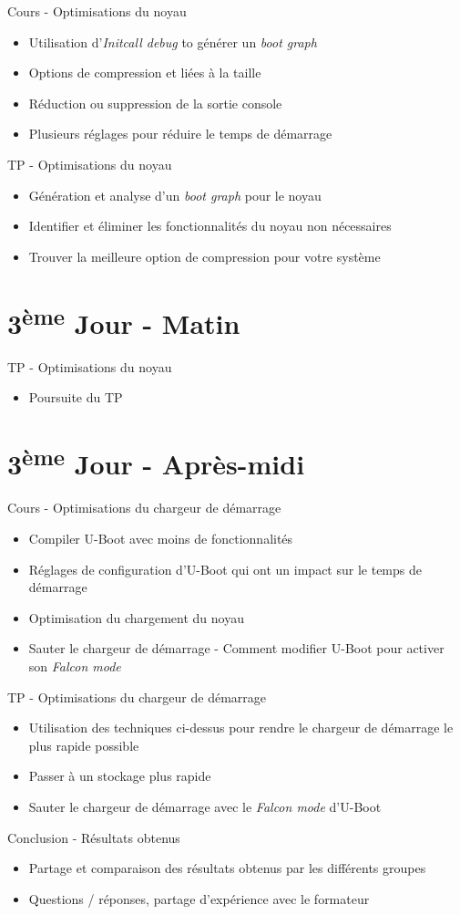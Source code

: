 \documentclass[a4paper,12pt,obeyspaces,spaces,hyphens]{article}
\begin{document}
\feagendatwocolumn
{Cours - Optimisations du noyau}
{
  \begin{itemize}
  \item Utilisation d'{\em Initcall debug} to générer un {\em boot graph}
  \item Options de compression et liées à la taille
  \item Réduction ou suppression de la sortie console
  \item Plusieurs réglages pour réduire le temps de démarrage
  \end{itemize}
}
{TP - Optimisations du noyau}
{
 \begin{itemize}
 \item Génération et analyse d'un {\em boot graph} pour le noyau
 \item Identifier et éliminer les fonctionnalités du noyau non nécessaires
 \item Trouver la meilleure option de compression pour votre système
 \end{itemize}
}

\section{3\textsuperscript{ème} Jour - Matin}

\feagendaonecolumn
{TP - Optimisations du noyau}
{
 \begin{itemize}
 \item Poursuite du TP
 \end{itemize}
}

\section{3\textsuperscript{ème} Jour - Après-midi}

\feagendatwocolumn
{Cours - Optimisations du chargeur de démarrage}
{
  \begin{itemize}
  \item Compiler U-Boot avec moins de fonctionnalités
  \item Réglages de configuration d'U-Boot qui ont un impact
        sur le temps de démarrage
  \item Optimisation du chargement du noyau
  \item Sauter le chargeur de démarrage - Comment modifier U-Boot pour
	activer son {\em Falcon mode}
  \end{itemize}
}
{TP - Optimisations du chargeur de démarrage}
{
 \begin{itemize}
 \item Utilisation des techniques ci-dessus pour rendre le chargeur
       de démarrage le plus rapide possible
 \item Passer à un stockage plus rapide
 \item Sauter le chargeur de démarrage avec le {\em Falcon mode} d'U-Boot
 \end{itemize}
}

\feagendaonecolumn
{Conclusion - Résultats obtenus}
{
 \begin{itemize}
 \item Partage et comparaison des résultats obtenus par les différents groupes
 \item Questions / réponses, partage d'expérience avec le formateur
 \end{itemize}
}
\end{document}
